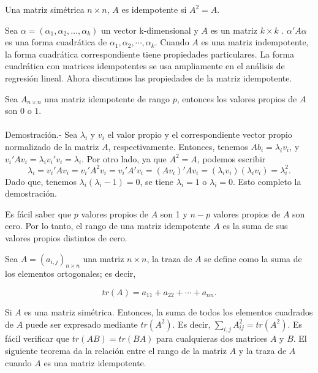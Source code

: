 \begin{def.}
    Una matriz simétrica $n\times n$, $A$ es idempotente si $A^2=A.$
\end{def.}

Sea $\alpha=(\alpha_1,\alpha_2,\ldots,\alpha_k)$ un vector k-dimensional y $A$ es un matriz $k\times k$ . $\alpha'A\alpha$ es una forma cuadrática de $\alpha_1,\alpha_2,\cdots,\alpha_k$. Cuando $A$ es una matriz indempotente, la forma cuadrática correspondiente tiene propiedades particulares. La forma cuadrática con matrices idempotentes se usa ampliamente en el análisis de regresión lineal. Ahora discutimos las propiedades de la matriz idempotente.

\begin{teo}
    Sea $A_{n\times n}$ una matriz idempotente de rango $p$, entonces los valores propios de $A$ son $0$ o $1$.\\\\
	Demostración.-\; Sea $\lambda_i$ y $v_i$ el valor propio y el correspondiente vector propio normalizado de la matriz $A$, respectivamente. Entonces, tenemos $Ab_i=\lambda_iv_i$, y $v_i' Av_i=\lambda_iv_i' v_i=\lambda_i$. Por otro lado, ya que $A^2=A$, podemos escribir
	$$\lambda_i=v_i'Av_i=v_i'A^2v_i=v_i'A'v_i=(Av_i)'Av_i=(\lambda_iv_i)(\lambda_iv_i)=\lambda_i^2.$$
	Dado que, tenemos $\lambda_i(\lambda_i-1)=0$, se tiene $\lambda_i=1$ o $\lambda_i=0$. Esto completo la demostración.
\end{teo}

Es fácil saber que $p$ valores propios de $A$ son 1 y $n - p$ valores propios de $A$ son cero. Por lo tanto, el rango de una matriz idempotente $A$ es la suma de sus valores propios distintos de cero.

\begin{def.}
    Sea $A=(a_{i,j})_{n\times n}$ una matriz $n\times n$, la traza de $A$ se define como la suma de los elementos ortogonales; es decir,

    $$tr(A)=a_{11}+a_{22}+\cdots+a_{nn}.$$
\end{def.}

Si $A$ es una matriz simétrica. Entonces, la suma de todos los elementos cuadrados de $A$ puede ser expresado mediante $tr\left(A^2\right)$. Es decir, $\sum_{i,j}A_{ij}^2=tr\left(A^2\right).$ Es fácil verificar que $tr(AB)=tr(BA)$ para cualquieras dos matrices $A$ y $B$. El siguiente teorema da la relación entre el rango de la matriz $A$ y la traza de $A$ cuando $A$ es una matriz idempotente.

